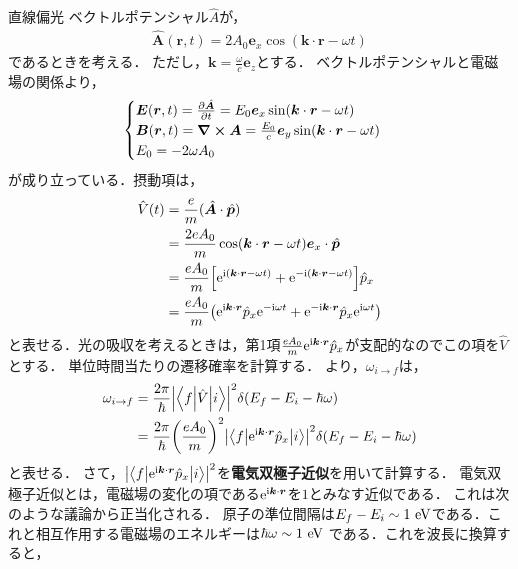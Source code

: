 \documentclass{report}
\begin{document}
  \begin{myex}{直線偏光}{}
    ベクトルポテンシャル$\hat{A}$が，
    \begin{align}
      \hat{\bm{A}}(\bm{r}, t) = 2A_0 \bm{e}_x \cos(\bm{k} \cdot \bm{r} - \omega t)
    \end{align}
    であるときを考える．
    ただし，$\bm{k} = \frac{\omega}{c}\bm{e}_z$とする．
    ベクトルポテンシャルと電磁場の関係より，
    \begin{align}
      \begin{cases}
      \bm{E}(\bm{r}, t) = \pdv{\hat{\bm{A}}}{t} = E_0 \bm{e}_x \sin(\bm{k} \cdot \bm{r} - \omega t)\\
      \bm{B}(\bm{r}, t) = \curl\bm{A} = \frac{E_0}{c}\bm{e}_y \sin(\bm{k} \cdot \bm{r} - \omega t)\\
      E_0 = -2 \omega A_0
      \end{cases}
    \end{align}
    が成り立っている．摂動項は，
    \begin{align}
      \hat{V}(t) &= \frac{e}{m}(\hat{\bm{A}}\cdot\hat{\bm{p}}) \\
      &= \frac{2eA_0}{m}\cos(\bm{k} \cdot \bm{r} - \omega t)\bm{e}_x\cdot\hat{\bm{p}} \\
      &= \frac{eA_0}{m}\qty[\mathrm{e}^{\mathrm{i}(\bm{k}\cdot\bm{r} - \omega t)} + \mathrm{e}^{-\mathrm{i}(\bm{k}\cdot\bm{r} - \omega t)}]\hat{p}_x\\
      &= \frac{eA_0}{m}\qty(\mathrm{e}^{\mathrm{i}\bm{k}\cdot\bm{r}}\hat{p}_x\mathrm{e}^{-\mathrm{i}\omega t} + \mathrm{e}^{-\mathrm{i} \bm{k}\cdot\bm{r}}\hat{p}_x \mathrm{e}^{\mathrm{i} \omega t})
    \end{align}
    と表せる．光の吸収を考えるときは，第1項$\frac{eA_0}{m}\mathrm{e}^{\mathrm{i}\bm{k}\cdot\bm{r}}\hat{p}_x$が支配的なのでこの項を$\hat{V}$とする．
    単位時間当たりの遷移確率を計算する．
    より，$\omega_{i\to f}$は，
    \begin{align}
      \omega_{i\to f} &= \frac{2\pi}{\hbar} \abs{\mel**{f}{\hat{V}}{i}}^2\delta(E_f - E_i - \hbar \omega) \\
      &= \frac{2 \pi}{\hbar}\qty(\frac{e A_0}{m})^2 \abs{\mel**{f}{\mathrm{e}^{\mathrm{i}\bm{k}\cdot \bm{r}}\hat{p}_x}{i}}^2 \delta(E_f - E_i - \hbar \omega)
    \end{align}
    と表せる．
    さて，$\abs{\mel**{f}{\mathrm{e}^{\mathrm{i}\bm{k}\cdot\bm{r}}\hat{p}_x}{i}}^2$を\textbf{電気双極子近似}を用いて計算する．
    電気双極子近似とは，電磁場の変化の項である$\mathrm{e}^{\mathrm{i}\bm{k}\cdot\bm{r}}$を$1$とみなす近似である．
    これは次のような議論から正当化される．
    原子の準位間隔は$E_f - E_i \sim 1\ \r{eV}$である．これと相互作用する電磁場のエネルギーは$\hbar \omega\sim 1\ \mathrm{eV}$ である．これを波長に換算すると，

\end{myex}
\end{document}
